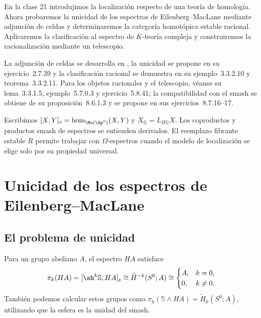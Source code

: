 
En la clase 21 introdujimos la localización respecto de una teoría de homología. Ahora probaremos la unicidad de los espectros de Eilenberg--MacLane mediante adjunción de celdas y determinaremos la categoría homotópica estable racional. Aplicaremos la clasificación al espectro de $K$-teoría compleja y construiremos la racionalización mediante un telescopio.

La adjunción de celdas se desarrolla en \cite[proposición~2.6.3.5 y observación~2.6.3.6]{malkiewich}, la unicidad se propone en su ejercicio~2.7.39 y la clasificación racional se demuestra en su ejemplo~3.3.2.10 y teorema~3.3.2.11. Para los objetos racionales y el telescopio, véanse su lema~3.3.1.5, ejemplo~5.7.0.3 y ejercicio~5.8.41; la compatibilidad con el smash se obtiene de su proposición~8.6.1.3 y se propone en sus ejercicios~8.7.16--17.

Escribimos $[X,Y]_s=\hom_{\Ho(\Sp^{\mathbb N})}(X,Y)$ y $X_{\mathbb Q}=L_{H\mathbb Q}X$. Los coproductos y productos smash de espectros se entienden derivados. El reemplazo fibrante estable $R$ permite trabajar con $\Omega$-espectros cuando el modelo de localización se elige solo por su propiedad universal.

\section{Unicidad de los espectros de Eilenberg--MacLane}

\subsection{El problema de unicidad}
Para un grupo abeliano $A$, el espectro $HA$ satisface
\[
\pi_k(HA)=[\sh^k\mathbb S,HA]_s
\cong\widetilde H^{-k}(S^0;A)
\cong
\begin{cases}
A,&k=0,\\
0,&k\ne0.
\end{cases}
\]
También podemos calcular estos grupos como $\pi_k(\mathbb S\wedge HA)=\widetilde H_k(S^0;A)$, utilizando que la esfera es la unidad del smash.

